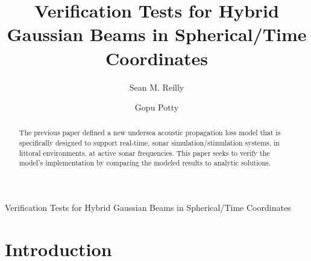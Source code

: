 \documentclass{ws-jca}
\begin{document}
{Verification Tests for Hybrid Gaussian Beams in Spherical/Time Coordinates}

%
\catchline{}{}{}{}{}
%

\title{Verification Tests for Hybrid Gaussian Beams in Spherical/Time Coordinates}

\author{Sean M. Reilly}
\address{Department of Ocean Engineering, University of Rhode Island,\\
Narragansett RI, USA\\
 }

\author{Gopu Potty}
\address{Department of Ocean Engineering, University of Rhode Island,\\
Narragansett RI, USA\\
 }

\maketitle

\begin{history}
\end{history}

\begin{abstract}
The previous paper defined a new undersea acoustic propagation loss model
that is specifically designed to support real-time, sonar
simulation/stimulation systems, in littoral environments, at active sonar
frequencies. This paper seeks to verify the model's implementation by
comparing the modeled results to analytic solutions.
\end{abstract}


\section{Introduction}
\end{document}
